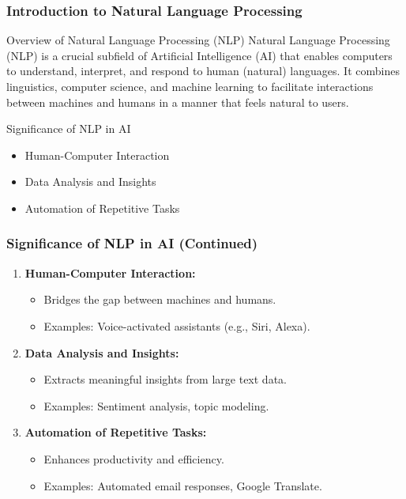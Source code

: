 \documentclass[aspectratio=169]{beamer}
\begin{document}
\frame{\titlepage}

\begin{frame}[fragile]
    \frametitle{Introduction to Natural Language Processing}
    
    \begin{block}{Overview of Natural Language Processing (NLP)}
        Natural Language Processing (NLP) is a crucial subfield of Artificial Intelligence (AI) that enables computers to understand, interpret, and respond to human (natural) languages. 
        It combines linguistics, computer science, and machine learning to facilitate interactions between machines and humans in a manner that feels natural to users.
    \end{block}
    
    \begin{block}{Significance of NLP in AI}
        \begin{itemize}
            \item Human-Computer Interaction
            \item Data Analysis and Insights
            \item Automation of Repetitive Tasks
        \end{itemize}
    \end{block}
\end{frame}

\begin{frame}[fragile]
    \frametitle{Significance of NLP in AI (Continued)}
    
    \begin{enumerate}
        \item \textbf{Human-Computer Interaction:}
        \begin{itemize}
            \item Bridges the gap between machines and humans.
            \item Examples: Voice-activated assistants (e.g., Siri, Alexa).
        \end{itemize}
        
        \item \textbf{Data Analysis and Insights:}
        \begin{itemize}
            \item Extracts meaningful insights from large text data.
            \item Examples: Sentiment analysis, topic modeling.
        \end{itemize}
        
        \item \textbf{Automation of Repetitive Tasks:}
        \begin{itemize}
            \item Enhances productivity and efficiency.
            \item Examples: Automated email responses, Google Translate.
        \end{itemize}
    \end{enumerate}
\end{frame}
\end{document}
